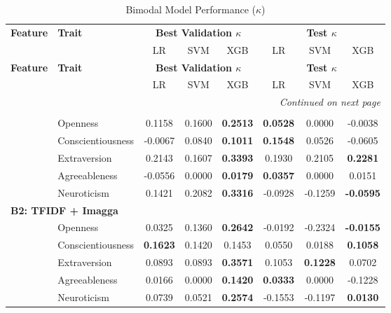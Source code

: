\begin{longtable}{llcccccc}
\caption{Bimodal Model Performance ($\kappa$)}\label{tab:bimodal_results_full} \\

\hline
\textbf{Feature} & \textbf{Trait} & \multicolumn{3}{c}{\textbf{Best Validation $\kappa$}} & \multicolumn{3}{c}{\textbf{Test $\kappa$}} \\
\cline{3-8}
 &  & LR & SVM & XGB & LR & SVM & XGB \\
\hline
\endfirsthead

\hline
\textbf{Feature} & \textbf{Trait} & \multicolumn{3}{c}{\textbf{Best Validation $\kappa$}} & \multicolumn{3}{c}{\textbf{Test $\kappa$}} \\
\cline{3-8}
 &  & LR & SVM & XGB & LR & SVM & XGB \\
\hline
\endhead

\hline
\multicolumn{8}{r}{\textit{Continued on next page}} \\
\endfoot

\hline
\endlastfoot

\multicolumn{8}{l}{\textbf{B1: TFIDF + Resnet50}} \\

& Openness & 0.1158 & 0.1600 & \textbf{0.2513} & \textbf{0.0528} & 0.0000 & -0.0038 \\
& Conscientiousness & -0.0067 & 0.0840 & \textbf{0.1011} & \textbf{0.1548} & 0.0526 & -0.0605 \\
& Extraversion & 0.2143 & 0.1607 & \textbf{0.3393} & 0.1930 & 0.2105 & \textbf{0.2281} \\
& Agreeableness & -0.0556 & 0.0000 & \textbf{0.0179} & \textbf{0.0357} & 0.0000 & 0.0151 \\
& Neuroticism & 0.1421 & 0.2082 & \textbf{0.3316} & -0.0928 & -0.1259 & \textbf{-0.0595} \\

\hline
\multicolumn{8}{l}{\textbf{B2: TFIDF + Imagga}} \\

& Openness & 0.0325 & 0.1360 & \textbf{0.2642} & -0.0192 & -0.2324 & \textbf{-0.0155} \\
& Conscientiousness & \textbf{0.1623} & 0.1420 & 0.1453 & 0.0550 & 0.0188 & \textbf{0.1058} \\
& Extraversion & 0.0893 & 0.0893 & \textbf{0.3571} & 0.1053 & \textbf{0.1228} & 0.0702 \\
& Agreeableness & 0.0166 & 0.0000 & \textbf{0.1420} & \textbf{0.0333} & 0.0000 & -0.1228 \\
& Neuroticism & 0.0739 & 0.0521 & \textbf{0.2574} & -0.1553 & -0.1197 & \textbf{0.0130} \\


\end{longtable}
